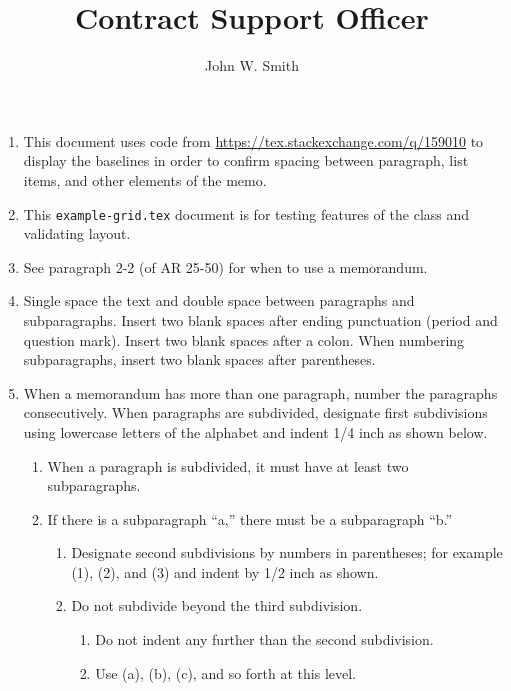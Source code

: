 \documentclass{../armymemo}
\author{John W. Smith}
\title{Contract Support Officer}
\begin{document}
\begin{enumerate}
	\item This document uses code from \url{https://tex.stackexchange.com/q/159010}
	      to display the baselines in order to confirm spacing between paragraph, list
	      items, and other elements of the memo.
	\item This \verb!example-grid.tex! document is for testing features of the class
	      and validating layout.
	\item See paragraph 2-2 (of AR 25-50) for when to use a memorandum.
	\item Single space the text and double space between paragraphs and
	      subparagraphs. Insert two blank spaces after ending punctuation (period and
	      question mark). Insert two blank spaces after a colon. When numbering
	      subparagraphs, insert two blank spaces after parentheses.
	\item When a memorandum has more than one paragraph, number the paragraphs
	      consecutively. When paragraphs are subdivided, designate first subdivisions
	      using lowercase letters of the alphabet and indent 1/4 inch as shown below.
	      \begin{enumerate}
		      \item When a paragraph is subdivided, it must have at least two subparagraphs.
		      \item If there is a subparagraph ``a,'' there must be a subparagraph ``b.''
		            \begin{enumerate}
			            \item Designate second subdivisions by numbers in parentheses; for example
			                  (1), (2), and (3) and indent by 1/2 inch as shown.
			            \item Do not subdivide beyond the third subdivision.
			                  \begin{enumerate}
				                  \item Do not indent any further than the second subdivision.
				                  \item Use (a), (b), (c), and so forth at this level.
			                  \end{enumerate}
		            \end{enumerate}
	      \end{enumerate}

\end{enumerate}
\end{document}
